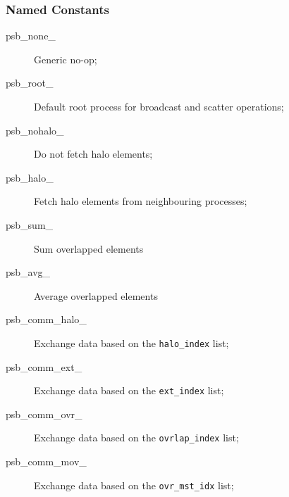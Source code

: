 \subsubsection{Named Constants}
\label{sec:cd_constants}
\begin{description}
\item[psb\_none\_] Generic no-op;
\item[psb\_root\_] Default root process for broadcast and scatter operations;
\item[psb\_nohalo\_]  Do not fetch halo elements;
\item[psb\_halo\_]  Fetch halo elements from neighbouring processes;
\item[psb\_sum\_] Sum overlapped elements
\item[psb\_avg\_] Average overlapped elements
\item[psb\_comm\_halo\_] Exchange data based on the \verb|halo_index|
  list;
\item[psb\_comm\_ext\_] Exchange data based on the \verb|ext_index|
  list;
\item[psb\_comm\_ovr\_] Exchange data based on the \verb|ovrlap_index|
  list;
\item[psb\_comm\_mov\_] Exchange data based on the \verb|ovr_mst_idx|
  list;

\end{description}


